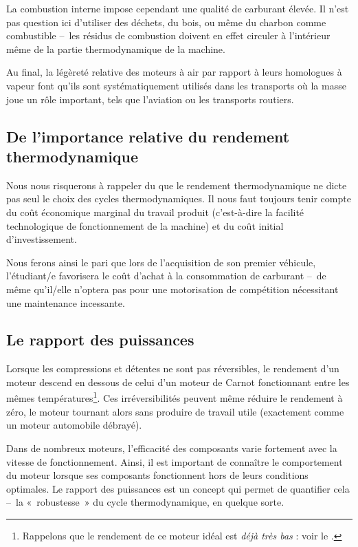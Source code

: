 		La combustion interne impose cependant une qualité de carburant élevée. Il n’est pas question ici d’utiliser des déchets, du bois, ou même du charbon comme combustible --\ les résidus de combustion doivent en effet circuler à l’intérieur même de la partie thermodynamique de la machine.

		Au final, la légèreté relative des moteurs à air par rapport à leurs homologues à vapeur font qu’ils sont systématiquement utilisés dans les transports où la masse joue un rôle important, tels que l’aviation ou les transports routiers.



	\subsection[Importance relative du rendement]{De l’importance relative du rendement thermodynamique}

		Nous nous risquerons à rappeler du \coursneuf que le rendement thermodynamique ne dicte pas seul le choix des cycles thermodynamiques. Il nous faut toujours tenir compte du coût économique marginal du travail produit (c’est-à-dire la facilité technologique de fonctionnement de la machine) et du coût initial d’investissement.

		Nous ferons ainsi le pari que lors de l’acquisition de son premier véhicule, l’étu\-diant/e favorisera le coût d’achat à la consommation de carburant --\ de même qu’il/\-elle n’optera pas pour une motorisation de compétition nécessitant une maintenance incessante.



	\subsection{Le rapport des puissances}
	\label{ch_rapport_des_puissances}

		Lorsque les compressions et détentes ne sont pas réversibles, le rendement d’un moteur descend en dessous de celui d’un moteur de Carnot fonctionnant entre les mêmes températures\footnote{Rappelons que le rendement de ce moteur idéal est \textit{déjà très bas} : voir le \courssept.}. Ces irréversibilités peuvent même réduire le rendement à zéro, le moteur tournant alors sans produire de travail utile (exactement comme un moteur automobile débrayé).

		Dans de nombreux moteurs, l’efficacité des composants varie fortement avec la vitesse de fonctionnement. Ainsi, il est important de connaître le comportement du moteur lorsque ses composants fonctionnent hors de leurs conditions optimales. Le rapport des puissances est un concept qui permet de quantifier cela --\ la «~robustesse~» du cycle thermodynamique, en quelque sorte.

